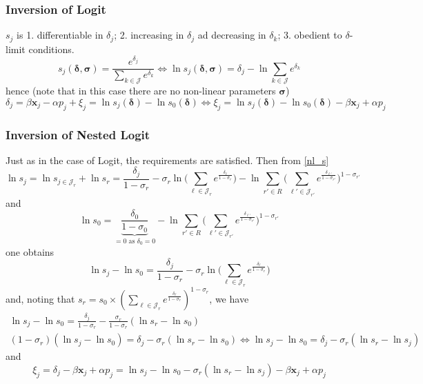 \documentclass[11pt]{article}
\begin{document}
\subsubsection{Inversion of Logit}
$s_j$ is 1. differentiable in $\delta_j$; 2. increasing in $\delta_j$ ad decreasing in $\delta_k$; 3. obedient to $\delta$-limit conditions.
\begin{equation*}
	s_j(\bm{\delta, \sigma}) = \frac{e^{\delta_j}}{\sum_{k \in \mathscr{J}} e^{\delta_k} } \Leftrightarrow \ln s_j(\bm{\delta, \sigma}) = \delta_j - \ln \sum_{k \in \mathscr{J}} e^{\delta_k}
\end{equation*}
hence (note that in this case there are no non-linear parameters $\bm{\sigma}$)
\begin{equation}
	\delta_j = \beta \bm{x}_j - \alpha p_j + \xi_j = \ln s_j(\bm{\delta}) - \ln s_0(\bm{\delta}) \Leftrightarrow \xi_j = \ln s_j(\bm{\delta}) - \ln s_0(\bm{\delta}) - \beta \bm{x}_j + \alpha p_j
\end{equation}

\subsubsection{Inversion of Nested Logit}
Just as in the case of Logit, the requirements are satisfied. Then from \eqref{nl_s}
\begin{equation*}
	\ln s_j = \ln s_{j \in \mathscr{J}_r} + \ln s_r = \frac{\delta_j}{1 - \sigma_r} - \sigma_r \ln \big(\sum_{\ell \in \mathscr{J}_r}e^{\frac{\delta_\ell}{1 - \sigma_r}}\big) -
	\ln \sum_{r' \in R}\big(\sum_{\ell' \in \mathscr{J}_{r'}}e^{\frac{\delta_{\ell'}}{1 - \sigma_{r'}}}\big)^{1 - \sigma_{r'}}
\end{equation*}
and
\begin{equation*}
	\ln s_0 = \underbrace{\frac{\delta_0}{1 - \sigma_0}}_{=0 \text{ as } \delta_0 = 0} -
	\ln \sum_{r' \in R}\big(\sum_{\ell' \in \mathscr{J}_{r'}}e^{\frac{\delta_{\ell'}}{1 - \sigma_{r'}}}\big)^{1 - \sigma_{r'}}
\end{equation*}
one obtains
\begin{equation*}
	\ln s_j - \ln s_0 = \frac{\delta_j}{1 - \sigma_r} - \sigma_r \ln \big(\sum_{\ell \in \mathscr{J}_r}e^{\frac{\delta_\ell}{1 - \sigma_r}}\big)
\end{equation*}
and, noting that $s_r = s_0 \times (\sum_{\ell \in \mathscr{J}_r}e^{\frac{\delta_\ell}{1 - \sigma_r}})^{1- \sigma_r}$, we have
\begin{equation}
	\begin{gathered}
			\ln s_j - \ln s_0 = \frac{\delta_j}{1 - \sigma_r} - \frac{\sigma_r}{1-\sigma_r} (\ln s_r - \ln s_0) \\
			(1 - \sigma_r)(\ln s_j - \ln s_0) = \delta_j - \sigma_r(\ln s_r - \ln s_0) \Leftrightarrow \ln s_j - \ln s_0 = \delta_j - \sigma_r(\ln s_r - \ln s_j)
	\end{gathered}
\end{equation}
and
\begin{equation}
	\xi_j = \delta_j - \beta \bm{x}_j + \alpha p_j  = \ln s_j - \ln s_0 - \sigma_r(\ln s_r - \ln s_j) - \beta \bm{x}_j + \alpha p_j
\end{equation}
\end{document}
